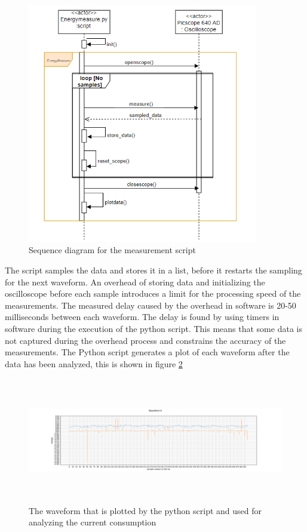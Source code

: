 \begin{figure}[H]
\centering
\includegraphics[height=10.5cm]{Project_Report/Images/Sequence_diagram.PNG}
\caption{Sequence diagram for the measurement script}
\label{fig:sequence}
\end{figure}
 

 The script samples the data and stores it in a list, before it restarts the sampling for the next waveform. An overhead of storing data and initializing the oscilloscope before each sample introduces a limit for the processing speed of the measurements. The measured delay caused by the overhead in software is 20-50 milliseconds between each waveform. The delay is found by using timers in software during the execution of the python script. This means that some data is not captured during the overhead process and constrains the accuracy of the measurements.
The Python script generates a plot of each waveform after the data has been analyzed, this is shown in figure \ref{fig:pythonwaveform}

\begin{figure}[H]
\hspace*{-3cm}
\includegraphics[height=5.5cm]{Project_Report/Images/pythonwaveform.png}
\caption{The waveform that is plotted by the python script and used for analyzing the current consumption}
\label{fig:pythonwaveform}
\end{figure}
 
